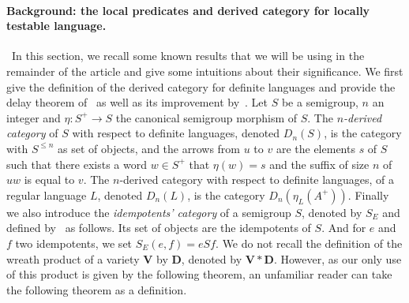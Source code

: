 \documentclass[submission,hidelink]{dmtcs-episciences}
\renewcommand{\leq}{\leqslant}
\newcommand{\D}{\mathbf{D}}
\newcommand{\V}{\mathbf{V}}
\begin{document}
\paragraph{Background: the local predicates and derived category for locally testable language.}
	\
		In this section, we recall some known results that we will be using in the remainder of the article and give some intuitions about their significance.
		We first give the definition of the derived category for definite languages and provide
		the delay theorem of~\cite{Straubing85} as well as its improvement
		by~\cite{Tilson}.
			Let $S$ be a semigroup, $n$ an integer and $\eta:S^+\to S$ the canonical semigroup morphism
			of $S$.
			The \emph{$n$-derived category} of $S$ with respect to definite languages, denoted $D_n(S)$, is
			the category with $S^{\leq n}$ as set of objects,
			and the arrows from $u$ to $v$ are the elements $s$ of $S$ such
			that there exists a word $w\in S^+$ that $\eta(w) = s$ and  the
			suffix of size $n$ of $uw$ is equal to $v$.
			The $n$-derived category with respect to definite languages, of a regular language $L$,
			denoted $D_n(L)$, is the category $D_n(\eta_L(A^+))$.
		Finally we also introduce the \emph{idempotents' category} of a semigroup $S$, denoted by
		$S_E$ and defined by~\cite{Tilson} as follows. Its set of objects are
		the idempotents of $S$. And for $e$ and $f$ two idempotents, we set $S_E(e,f) = eSf$.
		We do not recall the definition of the wreath product of a variety $\V$ by $\D$, denoted by
		$\V*\D$.
		However, as our only use of this product is given by the following theorem, an unfamiliar reader can take
		the following theorem as a definition.
\end{document}
